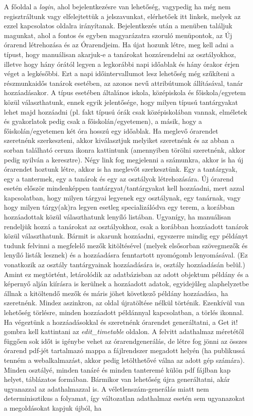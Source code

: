 \documentclass[12pt,a4paper]{report}
\begin{document}
A főoldal a \textit{login}, ahol bejelentkezésre van lehetőség, vagypedig ha még nem regisztráltunk vagy elfelejtettük a jelszavunkat, elérhetőek itt linkek, melyek az ezzel kapcsolatos oldalra irányítanak. Bejelentkezés után a menüben találjuk magunkat, ahol a fontos és egyben magyarázatra szoruló menüpontok, az Új órarend létrehozása és az Órarendjeim. Ha újat hozunk létre, meg kell adni a típust, hogy manuálisan akarjuk-e a tanárokat hozzárendelni az osztályokhoz, illetve hogy hány órától legyen a legkorábbi napi időablak és hány órakor érjen véget a legkésőbbi. Ezt a napi időintervallumot lesz lehetőség még szűkíteni a részmunkaidős tanárok esetében, az azonos nevű attribútumok állításával, tanár hozzáadásakor. A típus esetében általános iskola, középiskola és főiskola/egyetem közül választhatunk, ennek egyik jelentősége, hogy milyen típusú tantárgyakat lehet majd hozzáadni (pl. fakt típusú órák csak középiskolában vannak, elméletek és gyakorlatok pedig csak a főiskolán/egyetemen), a másik, hogy a főiskolán/egyetemen két óra hosszú egy időablak. Ha meglevő órarendet szeretnénk szerkeszteni, akkor kiválasztjuk melyiket szeretnénk és az abban a sorban található ceruza ikonra kattintunk (amennyiben törölni szeretnénk, akkor pedig nyilván a keresztre). Négy link fog megjelenni a számunkra, akkor is ha új órarendet hoztunk létre, akkor is ha meglevőt szerkesztünk. Egy a tantárgyak, egy a tantermek, egy a tanárok és egy az osztályok létrehozására. Új órarend esetén először mindenképpen tantárgyat/tantárgyakat kell hozzáadni, mert azzal kapcsolatban, hogy milyen tárgyai legyenek egy osztálynak, egy tanárnak, vagy hogy milyen tárgy(ak)ra legyen esetleg specializálódva egy terem, a korábban hozzáadottak közül választhatunk lenyíló listában. Ugyanígy, ha manuálisan rendeljük hozzá a tanárokat az osztályokhoz, csak a korábban hozzáadott tanárok közül választhatunk. Bármit is akarunk hozzáadni, egyszerre mindig egy példányt tudunk felvinni a megfelelő mezők kitöltésével (melyek elsősorban szövegmezők és lenyíló listák lesznek) és a hozzáadásra fenntartott nyomógomb lenyomásával. (Ez vonatkozik az osztály tantárgyainak hozzáadására is, osztály hozzáadásán belül.) Amint ez megtörtént, letárolódik az adatbázisban az adott objektum példány és a képernyő alján kiírásra is kerülnek a hozzáadott adatok, egyidejűleg alaphelyzetbe állnak a kitöltendő mezők és máris jöhet következő példány hozzáadása, ha szeretnénk. Mindez aszinkron, az oldal újratöltése nélkül történik. Ezenkívül van lehetőség törlésre, minden hozzáadott példánnyal kapcsolatban, a törlés ikonnal. Ha végeztünk a hozzáadásokkal és szeretnénk órarendet generáltatni, a Get it! gombra kell kattintani az \textit{edit\_timetable} oldalon. A felvitt adathalmaz méretétől függően sok időt is igénybe vehet az órarendgenerálás, de létre fog jönni az összes órarend pdf-jét tartalmazó mappa a fájlrendszer megadott helyén (ha publikussá tenném a webalkalmazást, akkor pedig letölthetővé válna az adott gép számára). Minden osztályé, minden tanáré és minden tanteremé külön pdf fájlban kap helyet, táblázatos formában. Bármikor van lehetőség újra generáltatni, akár ugyanazzal az adathalmazzal is. A véletlenszám-generálás miatt nem determinisztikus a folyamat, így változatlan adathalmaz esetén sem ugyanazokat a megoldásokat kapjuk újból, ha 
\end{document}
